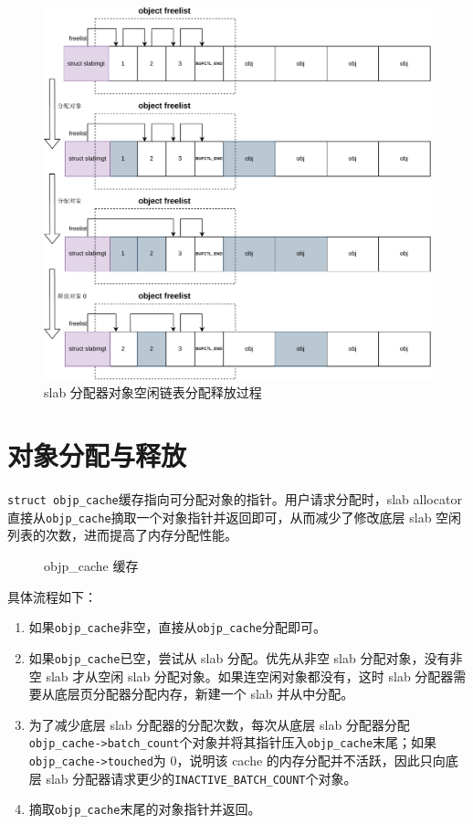 \documentclass[AutoFakeBold]{LZUThesis}
\begin{document}
\begin{sloppypar}
\begin{figure}[H]
\centering
\includegraphics[width=450pt]{images/alloc-obj-freelist-management.drawio.pdf}
\caption{slab 分配器对象空闲链表分配释放过程}
\label{figure:alloc-obj-freelist-management}
\end{figure}


\section{对象分配与释放}

\texttt{struct\ objp\_cache}缓存指向可分配对象的指针。用户请求分配时，slab allocator 直接从\texttt{objp\_cache}摘取一个对象指针并返回即可，从而减少了修改底层 slab 空闲列表的次数，进而提高了内存分配性能。

\begin{figure}[H]
\centering

\caption{objp\_cache 缓存}
\end{figure}

具体流程如下：

\begin{enumerate}
\def\labelenumi{\arabic{enumi}.}
\item
  如果\texttt{objp\_cache}非空，直接从\texttt{objp\_cache}分配即可。
\item
  如果\texttt{objp\_cache}已空，尝试从 slab 分配。优先从非空 slab 分配对象，没有非空 slab 才从空闲 slab 分配对象。如果连空闲对象都没有，这时 slab 分配器需要从底层页分配器分配内存，新建一个 slab 并从中分配。
\item
  为了减少底层 slab 分配器的分配次数，每次从底层 slab 分配器分配\texttt{objp\_cache-\textgreater{}batch\_count}个对象并将其指针压入\texttt{objp\_cache}末尾；如果\texttt{objp\_cache-\textgreater{}touched}为
  0，说明该 cache 的内存分配并不活跃，因此只向底层 slab
  分配器请求更少的\texttt{INACTIVE\_BATCH\_COUNT}个对象。
\item
  摘取\texttt{objp\_cache}末尾的对象指针并返回。
\end{enumerate}


\end{sloppypar}
\end{document}

